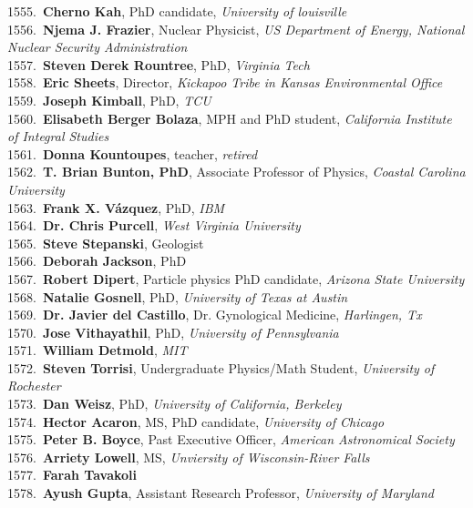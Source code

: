 1555.~{\bf Cherno Kah}, PhD candidate, {\sl University of louisville } \\
1556.~{\bf Njema J. Frazier}, Nuclear Physicist, {\sl US Department of Energy, National Nuclear Security Administration} \\
1557.~{\bf Steven Derek Rountree}, PhD, {\sl Virginia Tech} \\
1558.~{\bf Eric Sheets}, Director, {\sl Kickapoo Tribe in Kansas Environmental Office} \\
1559.~{\bf Joseph Kimball}, PhD, {\sl TCU} \\
1560.~{\bf Elisabeth Berger Bolaza}, MPH and PhD student, {\sl California Institute of Integral Studies} \\
1561.~{\bf Donna Kountoupes}, teacher, {\sl retired} \\
1562.~{\bf T. Brian Bunton, PhD}, Associate Professor of Physics, {\sl Coastal Carolina University} \\
1563.~{\bf Frank X. V\'{a}zquez}, PhD, {\sl IBM} \\
1564.~{\bf Dr. Chris Purcell}, {\sl West Virginia University} \\
1565.~{\bf Steve Stepanski}, Geologist \\
1566.~{\bf Deborah Jackson}, PhD \\
1567.~{\bf Robert Dipert}, Particle physics PhD candidate, {\sl Arizona State University} \\
1568.~{\bf Natalie Gosnell}, PhD, {\sl University of Texas at Austin} \\
1569.~{\bf Dr. Javier del Castillo}, Dr. Gynological Medicine, {\sl Harlingen, Tx} \\
1570.~{\bf Jose Vithayathil}, PhD, {\sl University of Pennsylvania} \\
1571.~{\bf William Detmold}, {\sl MIT} \\
1572.~{\bf Steven Torrisi}, Undergraduate Physics/Math Student, {\sl University of Rochester} \\
1573.~{\bf Dan Weisz}, PhD, {\sl University of California, Berkeley} \\
1574.~{\bf Hector Acaron}, MS, PhD candidate, {\sl University of Chicago} \\
1575.~{\bf Peter B. Boyce}, Past Executive Officer, {\sl American  Astronomical Society} \\
1576.~{\bf Arriety Lowell}, MS, {\sl Unviersity of Wisconsin-River Falls} \\
1577.~{\bf Farah Tavakoli} \\
1578.~{\bf Ayush Gupta}, Assistant Research Professor, {\sl University of Maryland} \\
